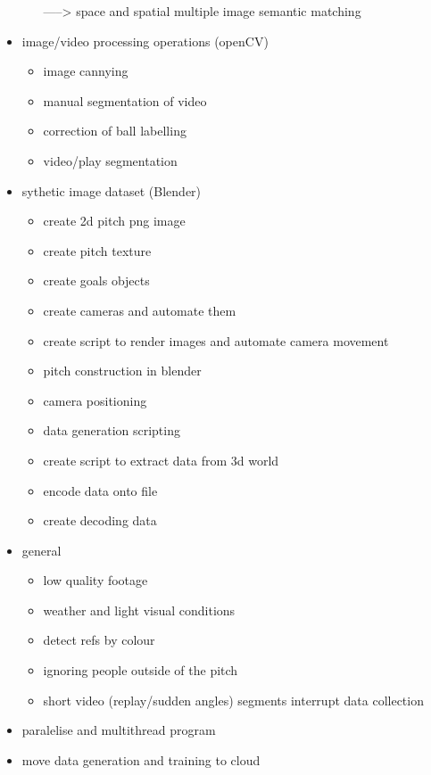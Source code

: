 \documentclass[
11pt,
twoside
]{report}
\begin{document}
\begin{itemize}
\begin{itemize}
    -----\textgreater{} space and spatial multiple image semantic
    matching
  \end{itemize}
\item
  image/video processing operations (openCV)

  \begin{itemize}
  \item
    image cannying
  \item
    manual segmentation of video
  \item
    correction of ball labelling
  \item
    video/play segmentation
  \end{itemize}
\item
  sythetic image dataset (Blender)

  \begin{itemize}
  \item
    create 2d pitch png image
  \item
    create pitch texture
  \item
    create goals objects
  \item
    create cameras and automate them
  \item
    create script to render images and automate camera movement
  \item
    pitch construction in blender
  \item
    camera positioning
  \item
    data generation scripting
  \item
    create script to extract data from 3d world
  \item
    encode data onto file
  \item
    create decoding data
  \end{itemize}
\item
  general

  \begin{itemize}
  \item
    low quality footage
  \item
    weather and light visual conditions
  \item
    detect refs by colour
  \item
    ignoring people outside of the pitch
  \item
    short video (replay/sudden angles) segments interrupt data
    collection
  \end{itemize}
\item
  paralelise and multithread program
\item
  move data generation and training to cloud
\end{itemize}
\end{document}
